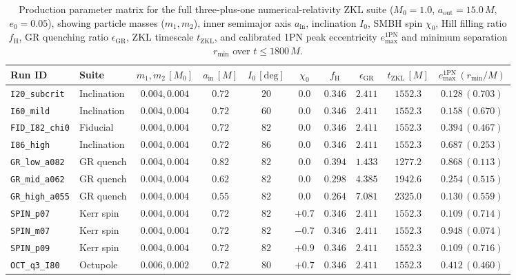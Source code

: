 \documentclass[aps,prl,twocolumn,10pt,superscriptaddress,nofootinbib,longbibliography,floatfix]{revtex4-2}
\begin{document}
\begin{table}[t]
  \caption{Production parameter matrix for the full three-plus-one numerical-relativity ZKL suite ($M_0 = 1.0$, $a_{\mathrm{out}} = 15.0\,M$, $e_0 = 0.05$), showing particle masses ($m_1, m_2$), inner semimajor axis $a_{\mathrm{in}}$, inclination $I_0$, SMBH spin $\chi_0$, Hill filling ratio $f_{\mathrm{H}}$, GR quenching ratio $\epsilon_{\mathrm{GR}}$, ZKL timescale $t_{\mathrm{ZKL}}$, and calibrated 1PN peak eccentricity $e_{\max}^{\mathrm{1PN}}$ and minimum separation $r_{\min}$ over $t \le 1800\,M$.}
  \label{tab:runs}
  \begin{ruledtabular}
  \begin{tabular}{llcccccccc}
    Run ID & Suite & $m_1, m_2\,[M_0]$ & $a_{\mathrm{in}}\,[M]$ & $I_0\,[\mathrm{deg}]$ & $\chi_0$ & $f_{\mathrm{H}}$ & $\epsilon_{\mathrm{GR}}$ & $t_{\mathrm{ZKL}}\,[M]$ & $e_{\max}^{\mathrm{1PN}}\,(r_{\min}/M)$ \\
    \hline
    \texttt{I20\_subcrit}  & Inclination & $0.004, 0.004$ & $0.72$ & $20$ & $0.0$  & $0.346$ & $2.411$ & $1552.3$ & $0.128\,(0.703)$ \\
    \texttt{I60\_mild}     & Inclination & $0.004, 0.004$ & $0.72$ & $60$ & $0.0$  & $0.346$ & $2.411$ & $1552.3$ & $0.158\,(0.670)$ \\
    \texttt{FID\_I82\_chi0}& Fiducial    & $0.004, 0.004$ & $0.72$ & $82$ & $0.0$  & $0.346$ & $2.411$ & $1552.3$ & $0.394\,(0.467)$ \\
    \texttt{I86\_high}     & Inclination & $0.004, 0.004$ & $0.72$ & $86$ & $0.0$  & $0.346$ & $2.411$ & $1552.3$ & $0.687\,(0.253)$ \\
    \texttt{GR\_low\_a082} & GR quench   & $0.004, 0.004$ & $0.82$ & $82$ & $0.0$  & $0.394$ & $1.433$ & $1277.2$ & $0.868\,(0.113)$ \\
    \texttt{GR\_mid\_a062} & GR quench   & $0.004, 0.004$ & $0.62$ & $82$ & $0.0$  & $0.298$ & $4.385$ & $1942.6$ & $0.254\,(0.515)$ \\
    \texttt{GR\_high\_a055}& GR quench   & $0.004, 0.004$ & $0.55$ & $82$ & $0.0$  & $0.264$ & $7.081$ & $2325.0$ & $0.130\,(0.559)$ \\
    \texttt{SPIN\_p07}     & Kerr spin   & $0.004, 0.004$ & $0.72$ & $82$ & $+0.7$ & $0.346$ & $2.411$ & $1552.3$ & $0.109\,(0.714)$ \\
    \texttt{SPIN\_m07}     & Kerr spin   & $0.004, 0.004$ & $0.72$ & $82$ & $-0.7$ & $0.346$ & $2.411$ & $1552.3$ & $0.948\,(0.074)$ \\
    \texttt{SPIN\_p09}     & Kerr spin   & $0.004, 0.004$ & $0.72$ & $82$ & $+0.9$ & $0.346$ & $2.411$ & $1552.3$ & $0.109\,(0.716)$ \\
    \texttt{OCT\_q3\_I80}  & Octupole    & $0.006, 0.002$ & $0.72$ & $80$ & $+0.7$ & $0.346$ & $2.411$ & $1552.3$ & $0.412\,(0.460)$ \\
  \end{tabular}
  \end{ruledtabular}
\end{table}


\end{document}
